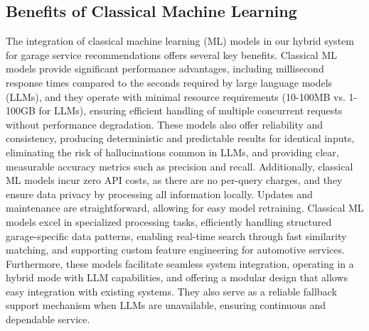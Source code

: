 \documentclass[conference]{IEEEtran}
\begin{document}
\subsection{Benefits of Classical Machine Learning}
The integration of classical machine learning (ML) models in our hybrid system for garage service recommendations offers several key benefits. Classical ML models provide significant performance advantages, including millisecond response times compared to the seconds required by large language models (LLMs), and they operate with minimal resource requirements (10-100MB vs. 1-100GB for LLMs), ensuring efficient handling of multiple concurrent requests without performance degradation. These models also offer reliability and consistency, producing deterministic and predictable results for identical inputs, eliminating the risk of hallucinations common in LLMs, and providing clear, measurable accuracy metrics such as precision and recall. Additionally, classical ML models incur zero API costs, as there are no per-query charges, and they ensure data privacy by processing all information locally. Updates and maintenance are straightforward, allowing for easy model retraining. Classical ML models excel in specialized processing tasks, efficiently handling structured garage-specific data patterns, enabling real-time search through fast similarity matching, and supporting custom feature engineering for automotive services. Furthermore, these models facilitate seamless system integration, operating in a hybrid mode with LLM capabilities, and offering a modular design that allows easy integration with existing systems. They also serve as a reliable fallback support mechanism when LLMs are unavailable, ensuring continuous and dependable service.
\end{document}
